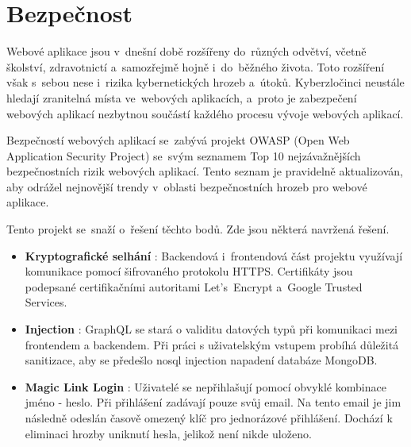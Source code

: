 \chapter{Bezpečnost}
Webové aplikace jsou v~dnešní době rozšířeny do~různých odvětví, včetně školství, zdravotnictí a~samozřejmě hojně i~do~běžného života. Toto rozšíření však s~sebou nese i~rizika kybernetických hrozeb a~útoků. Kyberzločinci neustále hledají zranitelná místa ve~webových aplikacích, a~proto je zabezpečení webových aplikací nezbytnou součástí každého procesu vývoje webových aplikací. \par
Bezpečností webových aplikací se~zabývá projekt OWASP \cite{owasp}(Open Web Application Security Project) se~svým seznamem Top 10 \cite{owasp10} nejzávažnějších bezpečnostních rizik webových aplikací. Tento seznam je pravidelně aktualizován, aby odrážel nejnovější trendy v~oblasti bezpečnostních hrozeb pro webové aplikace.\par
Tento projekt se~snaží o~řešení těchto bodů. Zde jsou některá navržená řešení.\par

\begin{itemize}
    \item \textbf{Kryptografické selhání} \cite{crypto}: Backendová i~frontendová část projektu využívají komunikace pomocí šifrovaného protokolu HTTPS. Certifikáty jsou podepsané certifikačními autoritami Let's~Encrypt\cite{letsencrypt} a~Google Trusted Services.
    \item \textbf{Injection} \cite{nosqlinjection}: GraphQL se stará o validitu datových typů při komunikaci mezi frontendem a backendem. Při práci s uživatelským vstupem probíhá důležitá sanitizace, aby se předešlo nosql injection napadení databáze MongoDB.
    \item \textbf{Magic Link Login} \cite{magiclinklogin}: Uživatelé se nepřihlašují pomocí obvyklé kombinace jméno - heslo. Při přihlášení zadávají pouze svůj email. Na tento email je jim následně odeslán časově omezený klíč pro jednorázové přihlášení. Dochází k eliminaci hrozby uniknutí hesla, jelikož není nikde uloženo.
\end{itemize}